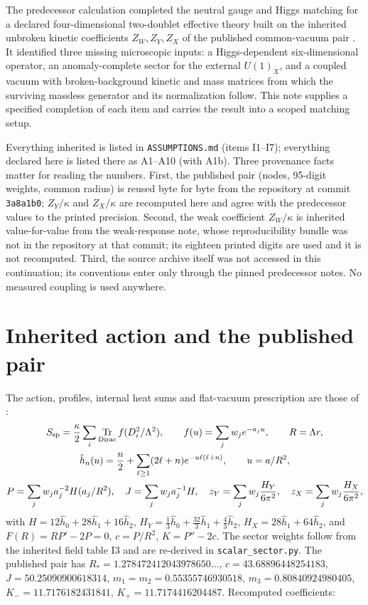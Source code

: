 \documentclass[11pt,letterpaper]{article}
\DeclareMathOperator{\Tr}{Tr}
\newcommand{\Lam}{\Lambda}
\begin{document}
The predecessor calculation \cite{neutral} completed the neutral gauge and Higgs matching for a declared four-dimensional two-doublet effective theory built on the inherited unbroken kinetic coefficients $Z_W,Z_Y,Z_X$ of the published common-vacuum pair \cite{oct21,oct22}. It identified three missing microscopic inputs: a Higgs-dependent six-dimensional operator, an anomaly-complete sector for the external $U(1)_X$, and a coupled vacuum with broken-background kinetic and mass matrices from which the surviving massless generator and its normalization follow. This note supplies a specified completion of each item and carries the result into a scoped matching setup.

Everything inherited is listed in \texttt{ASSUMPTIONS.md} (items I1--I7); everything declared here is listed there as A1--A10 (with A1b). Three provenance facts matter for reading the numbers. First, the published pair (nodes, 95-digit weights, common radius) is reused byte for byte from the repository at commit \texttt{3a8a1b0}; $Z_Y/\kappa$ and $Z_X/\kappa$ are recomputed here and agree with the predecessor values to the printed precision. Second, the weak coefficient $Z_W/\kappa$ is inherited value-for-value from the weak-response note, whose reproducibility bundle was not in the repository at that commit; its eighteen printed digits are used and it is not recomputed. Third, the source archive itself \cite{archive} was not accessed in this continuation; its conventions enter only through the pinned predecessor notes. No measured coupling is used anywhere.

\section{Inherited action and the published pair}

The action, profiles, internal heat sums and flat-vacuum prescription are those of \cite{oct21,oct22}:
\begin{gather}
S_{\rm sp}=\frac\kappa2\sum_i\Tr_{\rm Dirac}f(D_i^2/\Lam^2),\qquad f(u)=\sum_{j}w_je^{-a_ju},\qquad R=\Lam r,\\
\hat h_n(u)=\frac n2+\sum_{\ell\ge1}(2\ell+n)e^{-u\ell(\ell+n)},\qquad u=a/R^2,\\
P=\sum_jw_ja_j^{-2}H(a_j/R^2),\quad J=\sum_jw_ja_j^{-1}H,\quad z_Y=\sum_jw_j\frac{H_Y}{6\pi^2},\quad z_X=\sum_jw_j\frac{H_X}{6\pi^2},
\end{gather}
with $H=12\hat h_0+28\hat h_1+16\hat h_2$, $H_Y=\tfrac13\hat h_0+\tfrac{32}3\hat h_1+\tfrac43\hat h_2$, $H_X=28\hat h_1+64\hat h_2$, and $F(R)=RP'-2P=0$, $c=P/R^2$, $K=P''-2c$. The sector weights follow from the inherited field table I3 and are re-derived in \texttt{scalar\_sector.py}. The published pair has $R_*=1.278472412043978650\ldots$, $c=43.68896448254183$, $J=50.25090900618314$, $m_1=m_2=0.55355746930518$, $m_3=0.80840924980405$, $K_-=11.7176182431841$, $K_+=11.7174416204487$. Recomputed coefficients:
\end{document}
